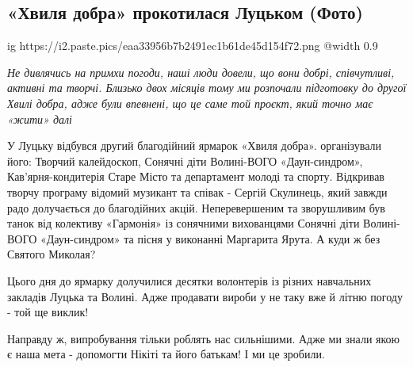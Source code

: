  
 
 
 
 
\subsection{«Хвиля добра» прокотилася Луцьком (Фото) }
\label{sec:18_12_2021.stz.news.ua.volyn.1.hvylja_dobra_luck}


\begin{center}
	
\ifcmt
  ig https://i2.paste.pics/eaa33956b7b2491ec1b61de45d154f72.png
  @width 0.9
\fi
\end{center}

\begingroup
\Large\em\color{blue}
Не дивлячись на примхи погоди, наші люди довели, що вони добрі, співчутливі,
активні та творчі. Близько двох місяців тому ми розпочали підготовку до другої
Хвилі добра, адже були впевнені, що це саме той проєкт, який точно має «жити»
далі
\endgroup

У Луцьку відбувся другий благодійний ярмарок «Хвиля добра». організували його:
Творчий калейдоскоп, Сонячні діти Волині-ВОГО «Даун-синдром»,
Кав'ярня-кондитерія Старе Місто та департамент молоді та спорту. Відкривав
творчу програму відомий музикант та співак - Сергій Скулинець, який завжди радо
долучається до благодійних акцій. Неперевершеним та зворушливим був танок від
колективу «Гармонія» із сонячними вихованцями Сонячні діти Волині-ВОГО
«Даун-синдром» та пісня у виконанні Маргарита Ярута. А куди ж без Святого
Миколая?


Цього дня до ярмарку долучилися десятки волонтерів із різних навчальних
закладів Луцька та Волині. Адже продавати вироби у не таку вже й літню погоду -
той ще виклик!

Направду ж, випробування тільки роблять нас сильнішими. Адже ми знали якою є
наша мета - допомогти Нікіті та його батькам! І ми це зробили.


